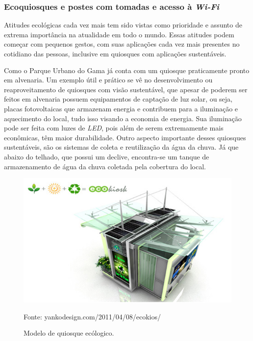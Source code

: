 \subsubsection{Ecoquiosques e postes com tomadas e acesso à \textit{Wi-Fi}}
	
	Atitudes ecológicas cada vez mais tem sido vistas como prioridade e assunto de extrema importância na atualidade em todo o mundo. Essas atitudes podem começar com pequenos gestos, com suas aplicações cada vez mais presentes no cotidiano das pessoas, inclusive em quiosques com aplicações sustentáveis.

	Como o  Parque Urbano do Gama já conta com um quiosque praticamente pronto em alvenaria. Um exemplo útil e prático se vê no desenvolvimento ou reaproveitamento de quiosques com visão sustentável, que apesar de poderem ser feitos em alvenaria possuem equipamentos de captação de luz solar, ou seja, placas fotovoltaicas que armazenam energia e contribuem para a iluminação e aquecimento do local,  tudo isso visando a economia de energia. Sua iluminação pode ser feita com luzes de \textit{LED}, pois além de serem extremamente mais econômicas, têm maior durabilidade. Outro aspecto importante desses quiosques sustentáveis, são os sistemas de coleta e reutilização da água da chuva. Já que abaixo do telhado, que possui um declive, encontra-se um tanque de armazenamento de água da chuva coletada pela cobertura do local.
	
\begin{figure}[H]
	 \centering
	\label{Modelo de quiosque ecólogico}
	 \includegraphics[keepaspectratio=true,scale=0.8]{interacao/24.png}
	 \caption{Modelo de quiosque ecólogico.}
	 \small{Fonte: yankodesign.com/2011/04/08/ecokios/}
\end{figure}

